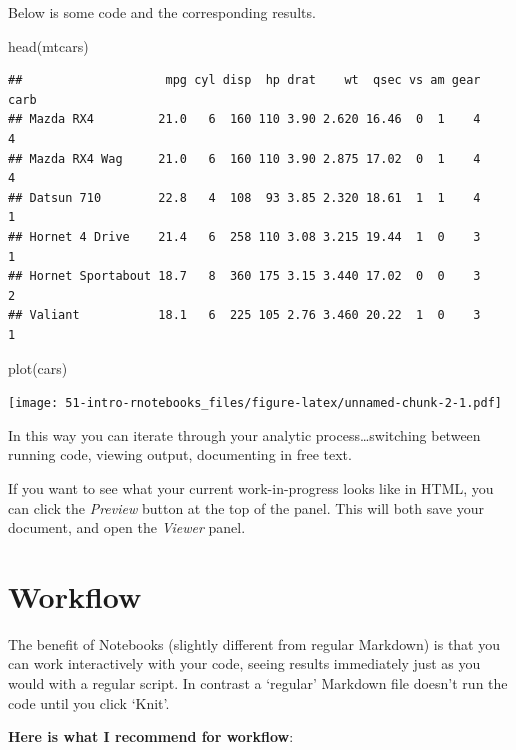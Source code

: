 \documentclass[
]{book}
\newenvironment{Shaded}{\begin{snugshade}}{\end{snugshade}}
\newcommand{\FunctionTok}[1]{\textcolor[rgb]{0.00,0.00,0.00}{#1}}
\newcommand{\NormalTok}[1]{#1}
\begin{document}
Below is some code and the corresponding results.

\begin{Shaded}
\begin{Highlighting}[]
\FunctionTok{head}\NormalTok{(mtcars)}
\end{Highlighting}
\end{Shaded}

\begin{verbatim}
##                    mpg cyl disp  hp drat    wt  qsec vs am gear carb
## Mazda RX4         21.0   6  160 110 3.90 2.620 16.46  0  1    4    4
## Mazda RX4 Wag     21.0   6  160 110 3.90 2.875 17.02  0  1    4    4
## Datsun 710        22.8   4  108  93 3.85 2.320 18.61  1  1    4    1
## Hornet 4 Drive    21.4   6  258 110 3.08 3.215 19.44  1  0    3    1
## Hornet Sportabout 18.7   8  360 175 3.15 3.440 17.02  0  0    3    2
## Valiant           18.1   6  225 105 2.76 3.460 20.22  1  0    3    1
\end{verbatim}

\begin{Shaded}
\begin{Highlighting}[]
\FunctionTok{plot}\NormalTok{(cars)}
\end{Highlighting}
\end{Shaded}

\texttt{[image: 51-intro-rnotebooks\_files/figure-latex/unnamed-chunk-2-1.pdf]}

In this way you can iterate through your analytic process\ldots switching between running code, viewing output, documenting in free text.

If you want to see what your current work-in-progress looks like in HTML, you can click the \emph{Preview} button at the top of the panel. This will both save your document, and open the \emph{Viewer} panel.

\hypertarget{workflow}{%
\section{Workflow}\label{workflow}}

The benefit of Notebooks (slightly different from regular Markdown) is that you can work interactively with your code, seeing results immediately just as you would with a regular script. In contrast a `regular' Markdown file doesn't run the code until you click `Knit'.

\textbf{Here is what I recommend for workflow}:
\end{document}
